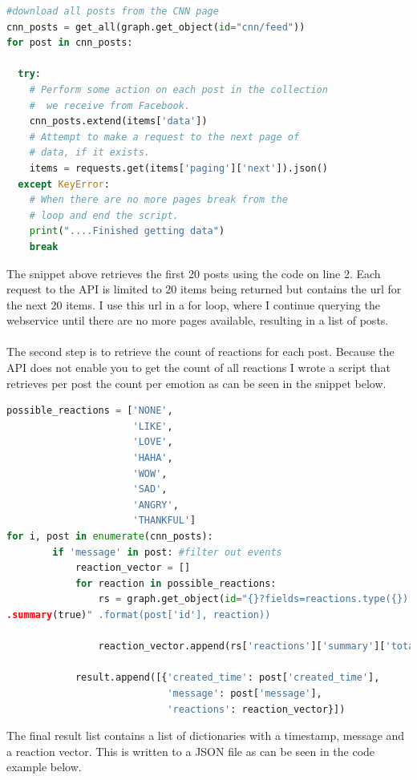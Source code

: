 \documentclass[11pt]{article}
\begin{document}
\begin{lstlisting}[language=Python, caption=Script that retrieves the posts from a Facebook page]
#download all posts from the CNN page
cnn_posts = get_all(graph.get_object(id="cnn/feed"))
for post in cnn_posts:
        
  try:
    # Perform some action on each post in the collection
    #  we receive from Facebook.
    cnn_posts.extend(items['data'])
    # Attempt to make a request to the next page of 
    # data, if it exists.
    items = requests.get(items['paging']['next']).json()
  except KeyError:
    # When there are no more pages break from the
    # loop and end the script.
    print("....Finished getting data")
    break
\end{lstlisting}
The snippet above retrieves the first 20 posts using the code on line 2. Each request to the API is limited to 20 items being returned but contains the url for the next 20 items. I use this url in a for loop, where I continue querying the webservice until there are no more pages available, resulting in a list of posts. \\\\
The second step is to retrieve the count of reactions for each post. Because the API does not enable you to get the count of all reactions I wrote a script that retrieves per post the count per emotion as can be seen in the snippet below.

\begin{lstlisting}[language=Python, caption=Retrieving emotion vector using Facebook API]
possible_reactions = ['NONE', 
                      'LIKE', 
                      'LOVE', 
                      'HAHA', 
                      'WOW', 
                      'SAD', 
                      'ANGRY', 
                      'THANKFUL']
for i, post in enumerate(cnn_posts):      
        if 'message' in post: #filter out events
            reaction_vector = []
            for reaction in possible_reactions:
                rs = graph.get_object(id="{}?fields=reactions.type({})
.summary(true)" .format(post['id'], reaction))
                                     
                reaction_vector.append(rs['reactions']['summary']['total_count'])
  
            result.append([{'created_time': post['created_time'], 
                            'message': post['message'], 
                            'reactions': reaction_vector}])
\end{lstlisting}
The final result list contains a list of dictionaries with a timestamp, message and a reaction vector. This is written to a JSON file as can be seen in the code example below.
\end{document}
